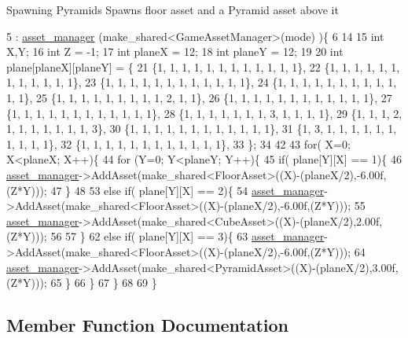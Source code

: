 Spawning Pyramids Spawns floor asset and a Pyramid asset above it
\begin{DoxyCode}
5                                           : \hyperlink{classGameWorld_aec5c0bca4fb5a41e4aac2dce2871266d}{asset\_manager} (make\_shared<GameAssetManager>(mode)
      )\{
6 
14 
15 \textcolor{keywordtype}{int} X,Y;
16 \textcolor{keywordtype}{int} Z = -1;
17 \textcolor{keywordtype}{int} planeX = 12;
18 \textcolor{keywordtype}{int} planeY = 12;
19 
20 \textcolor{keywordtype}{int} plane[planeX][planeY] = \{
21 \{1, 1, 1, 1, 1, 1, 1, 1, 1, 1, 1, 1\},
22 \{1, 1, 1, 1, 1, 1, 1, 1, 1, 1, 1, 1\},
23 \{1, 1, 1, 1, 1, 1, 1, 1, 1, 1, 1, 1\},
24 \{1, 1, 1, 1, 1, 1, 1, 1, 1, 1, 1, 1\},
25 \{1, 1, 1, 1, 1, 1, 1, 1, 1, 2, 1, 1\},
26 \{1, 1, 1, 1, 1, 1, 1, 1, 1, 1, 1, 1\},
27 \{1, 1, 1, 1, 1, 1, 1, 1, 1, 1, 1, 1\},
28 \{1, 1, 1, 1, 1, 1, 1, 3, 1, 1, 1, 1\},
29 \{1, 1, 1, 2, 1, 1, 1, 1, 1, 1, 1, 3\},
30 \{1, 1, 1, 1, 1, 1, 1, 1, 1, 1, 1, 1\},
31 \{1, 3, 1, 1, 1, 1, 1, 1, 1, 1, 1, 1\},
32 \{1, 1, 1, 1, 1, 1, 1, 1, 1, 1, 1, 1\},
33 \};
34 
42 
43  \textcolor{keywordflow}{for}( X=0; X<planeX; X++)\{
44    \textcolor{keywordflow}{for} (Y=0; Y<planeY; Y++)\{
45     \textcolor{keywordflow}{if}( plane[Y][X] == 1)\{  
46      \hyperlink{classGameWorld_aec5c0bca4fb5a41e4aac2dce2871266d}{asset\_manager}->AddAsset(make\_shared<FloorAsset>((X)-(planeX/2),-6.00f,(Z*Y)));
47     \}    
48 
53     \textcolor{keywordflow}{else} \textcolor{keywordflow}{if}( plane[Y][X] == 2)\{
54       \hyperlink{classGameWorld_aec5c0bca4fb5a41e4aac2dce2871266d}{asset\_manager}->AddAsset(make\_shared<FloorAsset>((X)-(planeX/2),-6.00f,(Z*Y)));
55       \hyperlink{classGameWorld_aec5c0bca4fb5a41e4aac2dce2871266d}{asset\_manager}->AddAsset(make\_shared<CubeAsset>((X)-(planeX/2),2.00f,(Z*Y)));
56 
57     \}
62     \textcolor{keywordflow}{else} \textcolor{keywordflow}{if}( plane[Y][X] == 3)\{
63       \hyperlink{classGameWorld_aec5c0bca4fb5a41e4aac2dce2871266d}{asset\_manager}->AddAsset(make\_shared<FloorAsset>((X)-(planeX/2),-6.00f,(Z*Y)));
64       \hyperlink{classGameWorld_aec5c0bca4fb5a41e4aac2dce2871266d}{asset\_manager}->AddAsset(make\_shared<PyramidAsset>((X)-(planeX/2),3.00f,(Z*Y)));
65     \}
66   \}
67  \}
68 
69 \}
\end{DoxyCode}


\subsection{Member Function Documentation}
\hypertarget{classGameWorld_a275418607d8286979b276f165ad5876b}{}
